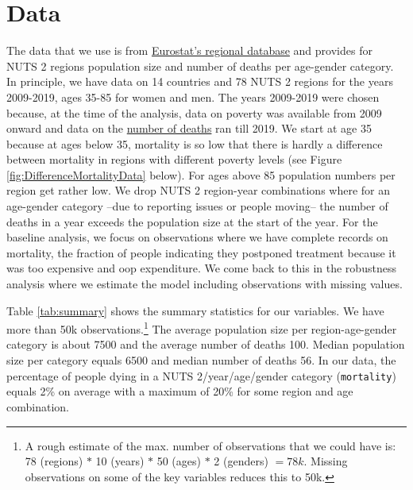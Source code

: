 \documentclass[a4paper,12pt]{article}
\begin{document}
\section{Data}
\label{sec:orgbc2e391}

The data that we use is from \href{https://ec.europa.eu/eurostat/web/regions/data/database}{Eurostat's regional database} and provides for NUTS 2 regions population size and number of deaths per age-gender category. In principle, we have data on 14 countries and 78 NUTS 2 regions for the years 2009-2019, ages 35-85 for women and men. The years 2009-2019 were chosen  because, at the time of the analysis, data on poverty was available from 2009 onward and data on the \href{https://ec.europa.eu/eurostat/databrowser/view/demo\_r\_magec/default/table?lang=en}{number of deaths} ran till 2019. We start at age 35 because at ages below 35, mortality is so low that there is hardly a difference between mortality in regions with different poverty levels (see Figure \ref{fig:DifferenceMortalityData} below). For ages above 85 population numbers per region get rather low. We drop NUTS 2 region-year combinations where for an age-gender category --due to reporting issues or people moving-- the number of deaths in a year exceeds the population size at the start of the year. For the baseline analysis, we focus on observations where we have complete records on mortality, the fraction of people indicating they postponed treatment because it was too expensive and oop expenditure. We come back to this in the robustness analysis where we estimate the model including observations with missing values.

Table \ref{tab:summary} shows the summary statistics for our variables. We have more than 50k observations.\footnote{A rough estimate of the max. number of observations that we could have is: 78 (regions) \(*\) 10 (years) \(*\) 50 (ages) \(*\) 2 (genders) \(=78k\). Missing observations on some of the key variables reduces this to 50k.} The average population size per region-age-gender category is about 7500 and the average number of deaths 100. Median population size per category equals 6500 and median number of deaths 56. In our data, the percentage of people dying in a NUTS 2/year/age/gender category (\texttt{mortality}) equals 2\% on average with a maximum of 20\% for some region and age combination.
\end{document}
